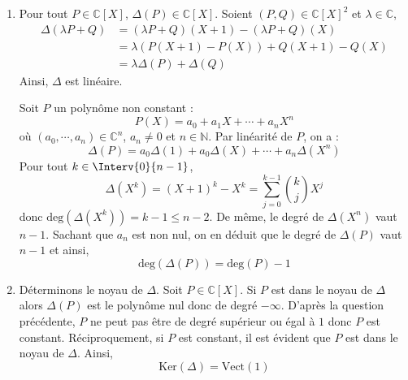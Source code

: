 \documentclass[a4paper,10pt]{report}
\begin{document}
\begin{enumerate}
\item Pour tout $P \in \mathbb{C}[X]$, $\Delta(P) \in \mathbb{C}[X]$. Soient $(P,Q) \in \mathbb{C}[X]^2$ et $\lambda \in \mathbb{C}$,
\begin{align*}
\Delta(\lambda P +Q) & = (\lambda P+Q)(X+1) - (\lambda P +Q)(X) \\
& = \lambda (P(X+1)-P(X)) + Q(X+1)-Q(X) \\
& = \lambda \Delta(P) + \Delta(Q)
\end{align*}
Ainsi, $\Delta$ est linéaire.

\medskip

\noindent Soit $P$ un polynôme non constant :
$$ P(X) = a_0 + a_1 X + \cdots + a_n X^n$$
où $(a_0, \cdots, a_n) \in \mathbb{C}^n$, $a_n \neq 0$ et $n \in \mathbb{N}$. Par linéarité de $P$, on a :
$$ \Delta(P) = a_0 \Delta(1)+ a_0 \Delta(X) + \cdots + a_n \Delta(X^n)$$
Pour tout $k \in \Interv{0}{n-1}$,
$$ \Delta(X^k) = (X+1)^k - X^k = \sum_{j=0}^{k-1} \binom{k}{j} X^j$$
donc $\textrm{deg}(\Delta(X^k))=k-1 \leq n-2$. De même, le degré de $\Delta(X^n)$ vaut $n-1$. Sachant que $a_n$ est non nul, on en déduit que le degré de $\Delta(P)$ vaut $n-1$ et ainsi,
$$ \textrm{deg}(\Delta(P)) = \textrm{deg}(P)-1$$
\item Déterminons le noyau de $\Delta$. Soit $P \in \mathbb{C}[X]$. Si $P$ est dans le noyau de $\Delta$ alors $\Delta(P)$ est le polynôme nul donc de degré $- \infty$. D'après la question précédente, $P$ ne peut pas être de degré supérieur ou égal à $1$ donc $P$ est constant. Réciproquement, si $P$ est constant, il est évident que $P$ est dans le noyau de $\Delta$. Ainsi,
$$ \textrm{Ker}(\Delta) = \textrm{Vect}(1)$$

\medskip


\end{enumerate}
\end{document}
